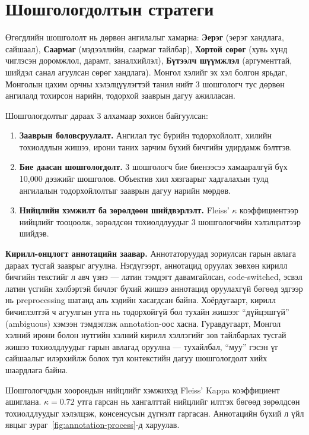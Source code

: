 \section{Шошгологдолтын стратеги}

Өгөгдлийн шошгололт нь дөрвөн ангилалыг хамарна: \textbf{Эерэг} (эерэг хандлага,
сайшаал), \textbf{Саармаг} (мэдээллийн, саармаг тайлбар), \textbf{Хортой сөрөг}
(хувь хүнд чиглэсэн доромжлол, дарамт, заналхийлэл),
\textbf{Бүтээлч шүүмжлэл} (аргументтай, шийдэл санал агуулсан сөрөг хандлага).
Монгол хэлийг эх хэл болгон ярьдаг, Монголын цахим орчны хэлэлцүүлэгтэй танил нийт 3 шошгологч тус дөрвөн ангилалд тохирсон нарийн, тодорхой зааврын дагуу
ажилласан.

Шошгологдолтыг дараах 3 алхамаар зохион байгуулсан:

\begin{enumerate}
  \item \textbf{Зааврын боловсруулалт.} Ангилал тус бүрийн тодорхойлолт, хилийн
    тохиолдлын жишээ, ирони таних зарчим бүхий бичгийн удирдамж бэлтгэв.
  \item \textbf{Бие даасан шошгологдолт.} 3 шошгологч бие биенээсээ хамааралгүй
    бүх 10,000 дээжийг шошголов. Объектив хил хязгаарыг хадгалахын тулд
    ангилалын тодорхойлолтыг зааврын дагуу нарийн мөрдөв.
  \item \textbf{Нийцлийн хэмжилт ба зөрөлдөөн шийдвэрлэлт.} Fleiss' $\kappa$
    коэффициентээр нийцлийг тооцоолж, зөрөлдсөн тохиолдлуудыг 3 шошгологчийн
    хэлэлцэлтээр шийдэв.
\end{enumerate}

\textbf{Кирилл-онцлогт аннотацийн заавар.} Аннотаторуудад зориулсан гарын авлага
дараах тусгай зааврыг агуулна. Нэгдүгээрт, аннотацид оруулах зөвхөн кирилл
бичгийн текстийг л авч үзнэ --- латин тэмдэгт давамгайлсан, code-switched, эсвэл
латин үсгийн хэлбэртэй бичлэг бүхий жишээ аннотацид оруулахгүй бөгөөд эдгээр нь
preprocessing шатанд аль хэдийн хасагдсан байна. Хоёрдугаарт, кирилл бичиглэлтэй
ч агуулгын утга нь тодорхойгүй бол тухайн жишээг ``дүйцэшгүй'' (ambiguous)
хэмээн тэмдэглэж annotation-оос хасна. Гуравдугаарт, Монгол хэлний ирони болон
нутгийн хэлний кирилл хэллэгийг зөв тайлбарлах тусгай жишээ тохиолдлуудыг
гарын авлагад оруулна --- тухайлбал, ``муу'' гэсэн үг сайшаалыг илэрхийлж болох
тул контекстийн дагуу шошгологдолт хийх шаардлага байна.

Шошгологчдын хоорондын нийцлийг хэмжихэд Fleiss' Kappa коэффициент ашиглана.
$\kappa = 0.72$ утга гарсан нь хангалттай нийцлийг илтгэх бөгөөд зөрөлдсөн тохиолдлуудыг
хэлэлцэж, консенсусын дүгнэлт гаргасан.
Аннотацийн бүхий л үйл явцыг зураг~\ref{fig:annotation-process}-д харуулав.

